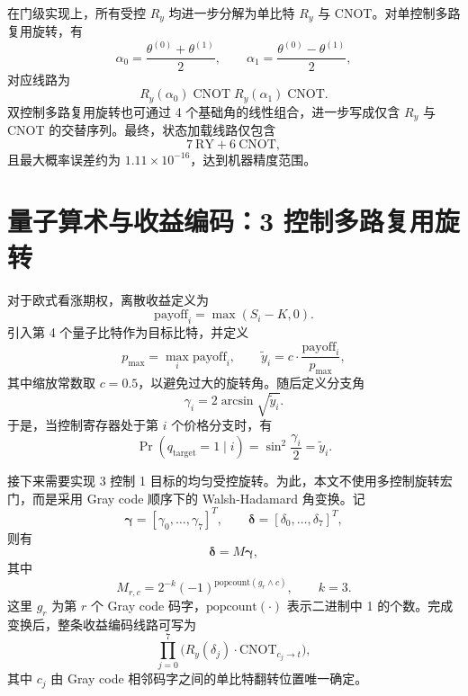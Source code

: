 \documentclass[12pt,a4paper]{ctexart}
\begin{document}
在门级实现上，所有受控 $R_y$ 均进一步分解为单比特 $R_y$ 与 CNOT。对单控制多路复用旋转，有
\begin{equation}
\alpha_0=\frac{\theta^{(0)}+\theta^{(1)}}{2},\qquad
\alpha_1=\frac{\theta^{(0)}-\theta^{(1)}}{2},
\end{equation}
对应线路为
\begin{equation}
R_y(\alpha_0)\;\mathrm{CNOT}\;R_y(\alpha_1)\;\mathrm{CNOT}.
\end{equation}
双控制多路复用旋转也可通过 4 个基础角的线性组合，进一步写成仅含 $R_y$ 与 CNOT 的交替序列。最终，状态加载线路仅包含
\begin{equation}
7\ \mathrm{RY} + 6\ \mathrm{CNOT},
\end{equation}
且最大概率误差约为 $1.11\times 10^{-16}$，达到机器精度范围。

\section{量子算术与收益编码：3 控制多路复用旋转}
对于欧式看涨期权，离散收益定义为
\begin{equation}
\mathrm{payoff}_i=\max(S_i-K,0).
\end{equation}
引入第 4 个量子比特作为目标比特，并定义
\begin{equation}
p_{\max}=\max_i \mathrm{payoff}_i,\qquad
\tilde y_i=c\cdot\frac{\mathrm{payoff}_i}{p_{\max}},
\end{equation}
其中缩放常数取 $c=0.5$，以避免过大的旋转角。随后定义分支角
\begin{equation}
\gamma_i=2\arcsin\sqrt{\tilde y_i}.
\end{equation}
于是，当控制寄存器处于第 $i$ 个价格分支时，有
\begin{equation}
\Pr(q_{\mathrm{target}}=1\mid i)=\sin^2\frac{\gamma_i}{2}=\tilde y_i.
\end{equation}

接下来需要实现 3 控制 1 目标的均匀受控旋转。为此，本文不使用多控制旋转宏门，而是采用 Gray code 顺序下的 Walsh-Hadamard 角变换。记
\begin{equation}
\bm{\gamma}=[\gamma_0,\ldots,\gamma_7]^T,\qquad
\bm{\delta}=[\delta_0,\ldots,\delta_7]^T,
\end{equation}
则有
\begin{equation}
\bm{\delta}=M\bm{\gamma},
\end{equation}
其中
\begin{equation}
M_{r,c}=2^{-k}(-1)^{\mathrm{popcount}(g_r\land c)},\qquad k=3.
\end{equation}
这里 $g_r$ 为第 $r$ 个 Gray code 码字，$\mathrm{popcount}(\cdot)$ 表示二进制中 1 的个数。完成变换后，整条收益编码线路可写为
\begin{equation}
\prod_{j=0}^{7}\Big(R_y(\delta_j)\cdot \mathrm{CNOT}_{c_j\rightarrow t}\Big),
\end{equation}
其中 $c_j$ 由 Gray code 相邻码字之间的单比特翻转位置唯一确定。
\end{document}
